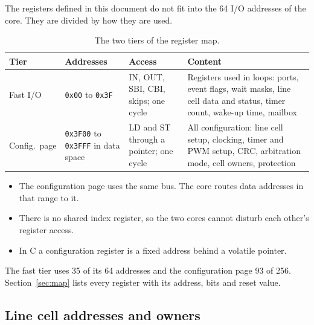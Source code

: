 \documentclass[10pt,a4paper]{article}
\begin{document}
The registers defined in this document do not fit into the 64 I/O addresses of the core. They are divided by
how they are used.

\begin{table}[H]
\centering\small
\begin{tabularx}{\linewidth}{@{}l>{\raggedright\arraybackslash}p{27mm}>{\raggedright\arraybackslash}p{33mm}L@{}}
\toprule
Tier & Addresses & Access & Content \\
\midrule
Fast I/O & \texttt{0x00} to \texttt{0x3F} & IN, OUT, SBI, CBI, skips; one cycle &
Registers used in loops: ports, event flags, wait masks, line cell data and status, timer count, wake-up time, mailbox \\
Config.\ page & \texttt{0x3F00} to \texttt{0x3FFF} in data space & LD and ST through a pointer; one cycle &
All configuration: line cell setup, clocking, timer and PWM setup, CRC, arbitration mode, cell owners, protection \\
\bottomrule
\end{tabularx}
\caption{The two tiers of the register map.}
\end{table}

\begin{itemize}
\item The configuration page uses the same bus. The core routes data addresses in that range to it.
\item There is no shared index register, so the two cores cannot disturb each other's register access.
\item In C a configuration register is a fixed address behind a volatile pointer.
\end{itemize}

The fast tier uses 35 of its 64 addresses and the configuration page 93 of 256. Section~\ref{sec:map} lists
every register with its address, bits and reset value.

\subsection{Line cell addresses and owners}
\end{document}
